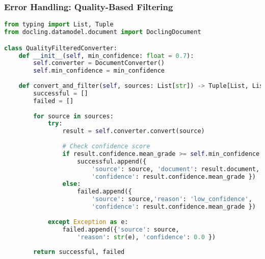 \begin{frame}[fragile]\frametitle{Error Handling: Quality-Based Filtering}

\begin{lstlisting}[language=Python, basicstyle=\tiny]
from typing import List, Tuple
from docling.datamodel.document import DoclingDocument

class QualityFilteredConverter:
    def __init__(self, min_confidence: float = 0.7):
        self.converter = DocumentConverter()
        self.min_confidence = min_confidence
        
    def convert_and_filter(self, sources: List[str]) -> Tuple[List, List]:
        successful = []
        failed = []
        
        for source in sources:
            try:
                result = self.converter.convert(source)
                
                # Check confidence score
                if result.confidence.mean_grade >= self.min_confidence:
                    successful.append({
                        'source': source, 'document': result.document,
                        'confidence': result.confidence.mean_grade })
                else:
                    failed.append({
                        'source': source,'reason': 'low_confidence',
                        'confidence': result.confidence.mean_grade })
                    
            except Exception as e:
                failed.append({'source': source,
                    'reason': str(e), 'confidence': 0.0 })
        
        return successful, failed
\end{lstlisting}
\end{frame}

